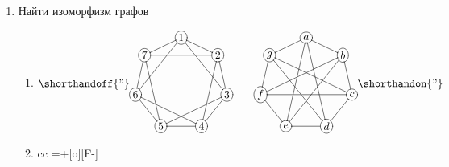\begin{enumerate}
    \item Найти изоморфизм графов
    \begin{enumerate}
        \item
        \(
            \shorthandoff{"}
            \begin{xy}
                \POS (0.00,15.00)*+[o][F-]{1}="a1"    \POS (11.73,9.35)*+[o][F-]{2}="b1"
                \POS (14.62,-3.34)*+[o][F-]{3}="c1"   \POS (6.51,-13.51)*+[o][F-]{4}="d1"
                \POS (-6.51,-13.51)*+[o][F-]{5}="e1"  \POS (-14.62,-3.34)*+[o][F-]{6}="f1"
                \POS (-11.73,9.35)*+[o][F-]{7}="g1"   \POS (40.00,15.00)*+[o][F-]{a}="a2"
                \POS (51.73,9.35)*+[o][F-]{b}="b2"    \POS (54.62,-3.34)*+[o][F-]{c}="c2"
                \POS (46.51,-13.51)*+[o][F-]{d}="d2"  \POS (33.49,-13.51)*+[o][F-]{e}="e2"
                \POS (25.38,-3.34)*+[o][F-]{f}="f2"   \POS (28.27,9.35)*+[o][F-]{g}="g2"
                \POS"a1" \ar @{-} "b1"    \POS"a1" \ar @{-} "c1"
                \POS"a1" \ar @{-} "f1"    \POS"a1" \ar @{-} "g1"
                \POS"b1" \ar @{-} "g1"    \POS"b1" \ar @{-} "c1"
                \POS"b1" \ar @{-} "d1"    \POS"c1" \ar @{-} "d1"
                \POS"c1" \ar @{-} "e1"    \POS"d1" \ar @{-} "e1"
                \POS"d1" \ar @{-} "f1"    \POS"e1" \ar @{-} "f1"
                \POS"e1" \ar @{-} "g1"    \POS"f1" \ar @{-} "g1"
                \POS"a2" \ar @{-} "b2"    \POS"a2" \ar @{-} "d2"
                \POS"b2" \ar @{-} "c2"    \POS"b2" \ar @{-} "e2"
                \POS"c2" \ar @{-} "d2"    \POS"c2" \ar @{-} "f2"
                \POS"d2" \ar @{-} "e2"    \POS"d2" \ar @{-} "g2"
                \POS"e2" \ar @{-} "f2"    \POS"e2" \ar @{-} "a2"
                \POS"f2" \ar @{-} "g2"    \POS"f2" \ar @{-} "b2"
                \POS"g2" \ar @{-} "a2"    \POS"g2" \ar @{-} "c2" 
            \end{xy}
            \shorthandon{"}
        \)
        \item
        \begin{tabular}{cc}
            {\entrymodifiers={+[o][F-]}
            }
\end{tabular}
\end{enumerate}
\end{enumerate}
